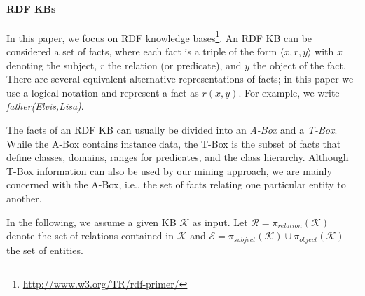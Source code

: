 
\paragraph{RDF KBs} In this paper, we focus on RDF knowledge bases\footnote{\url{http://www.w3.org/TR/rdf-primer/}}. 
An RDF KB can be considered a set of facts, where each fact is a triple of the form $\langle x, r, y\rangle$ with $x$ denoting the subject, $r$ the relation (or predicate), and $y$ the object of the fact. 
There are several equivalent alternative representations of facts; in this paper we use a logical notation and represent a fact as $r(x,y)$. For example, we write \emph{father(Elvis,Lisa)}. 

The facts of an RDF KB can usually be divided into an \emph{A-Box} and a \emph{T-Box}. While the A-Box contains instance data, the T-Box is the subset of facts that define classes, domains, ranges for predicates, and the class hierarchy. Although T-Box information can also be used by our mining approach, we are mainly concerned with the A-Box, i.e., the set of facts relating one particular entity to another. 

In the following, we assume a given KB $\mathcal{K}$ as input. Let $\mathcal{R}=\pi_{relation}(\mathcal{K})$ denote the set of relations contained in $\mathcal{K}$ and $\mathcal{E}=\pi_{subject}(\mathcal{K}) \cup \pi_{object}(\mathcal{K})$ the set of entities.

